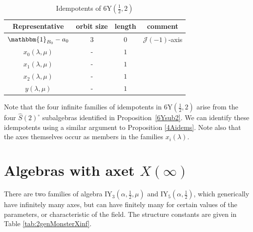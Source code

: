 \documentclass[11pt, a4paper]{article}
\theoremstyle{plain}
\theoremstyle{definition}
\newcommand\al{\alpha}
\newcommand\lm{\lambda}
\newcommand\cJ{\mathcal{J}}
\newcommand{\Y}{\mathrm{Y}}
\newcommand{\IY}{\mathrm{IY}}
\newcommand{\0}{\overline{0}}
\newcommand{\2}{\overline{2}}
\newcommand{\1}{\mathbbm{1}}
\begin{document}
\begin{table}[h!tb]
\centering
	\begin{tabular}{cccc}
		\hline
		Representative & orbit size & length & comment \\
		\hline
		$\1_{B_0}-a_0$ & $3$ &  $0$ & $\cJ(-1)$-axis \\
		$x_0(\lm, \mu)$ & - & $1$  &   \\ 
		$x_1(\lm, \mu)$ & - & $1$  &   \\ 
		$x_2(\lm, \mu)$ & - &  $1$ &   \\ 
		$y(\lm, \mu)$ & - & $1$  &  \\
	\end{tabular}
	\caption{Idempotents of $6\Y(\frac{1}{2}, 2)$}\label{tab:6Yidempotents}
\end{table}

Note that the four infinite families of idempotents in $6\Y(\frac{1}{2}, 2)$ arise from the four $\widehat{S}(2)^\circ$ subalgebras identified in Proposition~\ref{6Ysub2}. We can identify these idempotents using a similar argument to Proposition \ref{4Aidems}. Note also that the axes themselves occur as members in the families $x_i(\lm)$.


\section{Algebras with axet $X(\infty)$}

There are two families of algebra $\IY_3(\al, \frac{1}{2}, \mu)$ and $\IY_5(\al, \frac{1}{2})$, which generically have infinitely many axes, but can have finitely many for certain values of the parameters, or characteristic of the field.  The structure constants are given in Table \ref{tab:2genMonsterXinf}.
\end{document}
